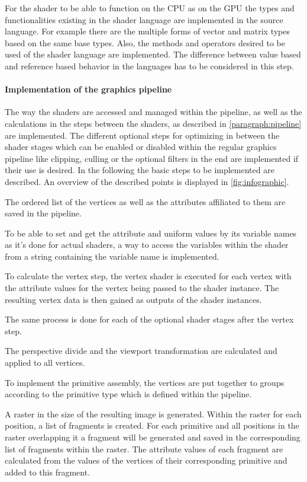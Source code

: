 For the shader to be able to function on the CPU as on the GPU the types and functionalities existing in the shader language are implemented in the source language. For example there are the multiple forms of vector and matrix types based on the same base types. Also, the methods and operators desired to be used of the shader language are implemented. The difference between value based and reference based behavior in the languages has to be considered in this step.

\paragraph{Implementation of the graphics pipeline}

The way the shaders are accessed and managed within the pipeline, as well as the calculations in the steps between the shaders, as described in \autoref{paragraph:pipeline} are implemented. The different optional steps for optimizing in between the shader stages which can be enabled or disabled within the regular graphics pipeline like clipping, culling or the optional filters in the end are implemented if their use is desired. In the following the basic steps to be implemented are described. An overview of the described points is displayed in \autoref{fig:infographic}.

The ordered list of the vertices as well as the attributes affiliated to them are saved in the pipeline.

To be able to set and get the attribute and uniform values by its variable names as it's done for actual shaders, a way to access the variables within the shader from a string containing the variable name is implemented.

To calculate the vertex step, the vertex shader is executed for each vertex with the attribute values for the vertex being passed to the shader instance. The resulting vertex data is then gained as outputs of the shader instances.

The same process is done for each of the optional shader stages after the vertex step.

The perspective divide and the viewport transformation are calculated and applied to all vertices.

To implement the primitive assembly, the vertices are put together to groups according to the primitive type which is defined within the pipeline.

A raster in the size of the resulting image is generated. Within the raster for each position, a list of fragments is created. For each primitive and all positions in the raster overlapping it a fragment will be generated and saved in the corresponding list of fragments within the raster. The attribute values of each fragment are calculated from the values of the vertices of their corresponding primitive and added to this fragment.

